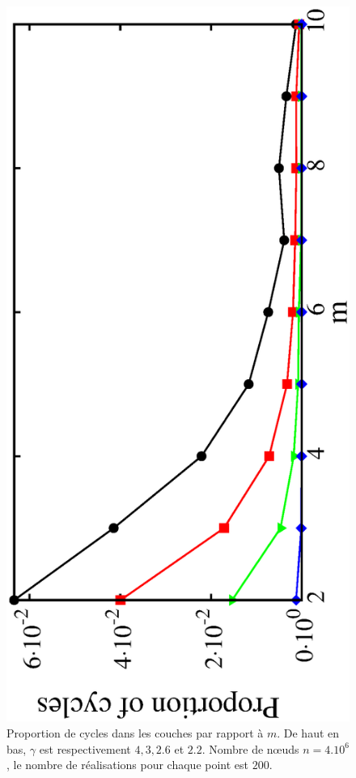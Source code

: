 \begin{figure}[h]
	\begin{center}
		\includegraphics[angle=-90,scale=0.5]{./figures/fig3-3}
	\end{center}
	\caption{Proportion de cycles dans les couches par rapport à $ m $. De haut en bas, $ \gamma $ est respectivement $ 4, 3, 2.6 $ et $ 2.2 $. Nombre de nœuds $ n = 4.10^6 $, le nombre de réalisations pour chaque point est $200 $.}
	\label{fig3-3}
\end{figure}
